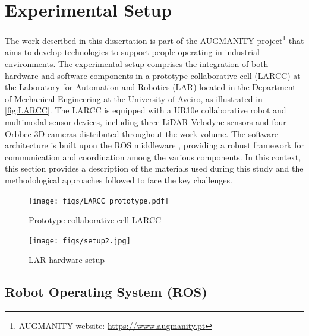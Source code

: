 \section{Experimental Setup}
\label{section:system_architecture}

The work described in this dissertation is part of the AUGMANITY project\footnote{AUGMANITY website: \url{https://www.augmanity.pt}} that aims to develop technologies to support people operating in industrial environments. The experimental setup comprises the integration of both hardware and software components in a prototype collaborative cell (LARCC) at the Laboratory for Automation and Robotics (LAR) located in the Department of Mechanical Engineering at the University of Aveiro, as illustrated in \autoref{fig:LARCC}. The LARCC is equipped with a UR10e collaborative robot and multimodal sensor devices, including three LiDAR Velodyne sensors and four Orbbec 3D cameras distributed throughout the work volume. The software architecture is built upon the ROS middleware \cite{Quigley2009}, providing a robust framework for communication and coordination among the various components. In this context, this section provides a description of the materials used during this study and the methodological approaches followed to face the key challenges. 

\begin{figure}[ht]
    \centering
    \texttt{[image: figs/LARCC\_prototype.pdf]}
    \caption{Prototype collaborative cell LARCC}
    \label{fig:LARCC}
\end{figure}

\begin{figure}[!ht]
\centerline{\texttt{[image: figs/setup2.jpg]}}
\caption[setup]{LAR hardware setup}
\label{fig:LARCC}
\end{figure}
\fi

\subsection{Robot Operating System (ROS)}

